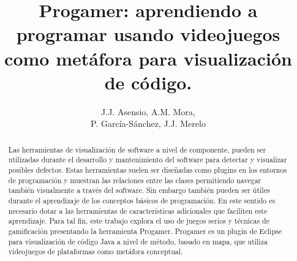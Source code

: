 \documentclass{llncs}
\begin{document}

\title{Progamer: aprendiendo a programar usando videojuegos como metáfora para visualización de código.}


\author{J.J. Asensio, A.M. Mora, \\P. García-Sánchez, J.J. Merelo}

\maketitle
%
%
\begin{abstract} 
Las herramientas de visualización de software a nivel de componente, pueden ser utilizadas durante el desarrollo y mantenimiento del software para detectar y visualizar posibles defectos. Estas herramientas suelen ser diseñadas como plugins en los entornos de programación y muestran las relaciones entre las clases permitiendo navegar también visualmente a través del software. Sin embargo también pueden ser útiles durante el aprendizaje de los conceptos básicos de programación. En este sentido es necesario dotar a las herramientas de características adicionales que faciliten este aprendizaje. Para tal fin, este trabajo explora el uso de juegos serios y técnicas de gamificación presentando la herramienta Progamer. Progamer es un plugin de Eclipse para visualización de código Java a nivel de método, basado en mapa, que utiliza videojuegos de plataformas como metáfora conceptual.
\end{abstract}


%
%
\end{document}
